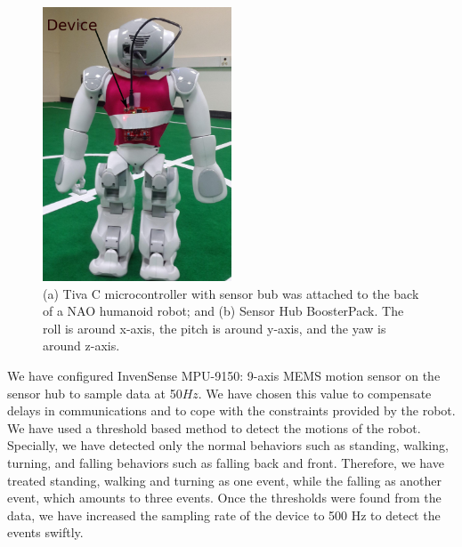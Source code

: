 \documentclass{llncs}
\begin{document}
\begin{sloppy}
\begin{figure}[!ht]
\centering
 \includegraphics[width=0.5\textwidth] {attached_device}
 \caption{(a) Tiva C microcontroller with sensor bub was attached to the back of a NAO humanoid
robot; and (b) Sensor Hub BoosterPack. The roll is around x-axis, the pitch is around y-axis, and
the yaw is around z-axis.}
 \label{fig:attached_device}
\end{figure}
\vspace{-5mm}
We have configured InvenSense MPU-9150: 9-axis MEMS motion sensor on the sensor hub to sample data
at 50$Hz$. We have chosen this value to compensate delays in communications and to cope with the
constraints provided by the robot. We have used a threshold based method to detect the motions of
the robot. Specially, we have detected only the normal behaviors such as standing, walking, turning,
and falling behaviors such as falling back and front. Therefore, we have treated standing, walking
and turning as one event, while the falling as another event, which amounts to three events. Once
the thresholds were found from the data, we have increased the sampling rate of the device to 500 Hz
to detect the events swiftly.  


\end{sloppy}
\end{document}
